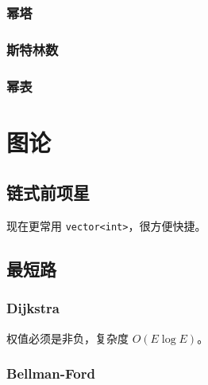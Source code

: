 \documentclass{probook}
\begin{document}
\begin{multicols}{2}
\subsection{幂塔}



\subsection{斯特林数}



\subsection{幂表}







\chapter{图论}

\section{链式前项星}

现在更常用 \lstinline{vector<int>}，很方便快捷。



\section{最短路}

\subsection{Dijkstra}

权值必须是非负，复杂度 $O(E\log E)$。



\subsection{Bellman-Ford}


\end{multicols}
\end{document}
